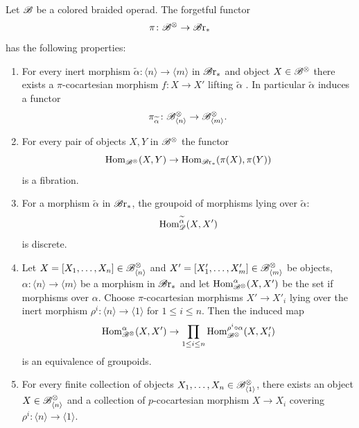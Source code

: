 \begin{prop}\label{prop:Bx-fib-properties} Let $\mathscr{B}$ be a colored braided operad.
    The forgetful functor
    \[
        \pi \colon \mathscr{B}^{\otimes} \to \mathscr{B} \text{r}_{\ast}
    \]
    has the following properties:
    \begin{enumerate}
        \item For every inert morphism $\widetilde{\alpha} \colon \langle n
        \rangle \to \langle m \rangle$  in $\mathscr{B} \text{r}_{\ast}$ and object $X \in \mathscr{B}^{\otimes}$ there
        exists a $\pi$-cocartesian morphism $f \colon X \to X'$ lifting
        $\widetilde{\alpha}$ . In particular $\widetilde{\alpha}$ induces a
        functor 
        $$\pi_{\widetilde{\alpha}} \colon \mathscr{B}^{\otimes}_{\langle n \rangle} \to
        \mathscr{B}^{\otimes}_{\langle m \rangle}.$$
        \item For every pair of objects $X,Y$ in $\mathscr{B}^{\otimes}$ the functor
        \[
                \operatorname{Hom}_{\mathscr{B}^{\otimes}}(X,Y) \to \operatorname{Hom}_{\mathscr{B} \text{r}_{\ast}}(\pi(X),\pi(Y))
        \]
        is a fibration.
        \item For a morphism $\widetilde{\alpha}$ in $\mathscr{B} \text{r}_{\ast}$, the groupoid of
        morphisms lying over $\widetilde{\alpha}$:
        $$\operatorname{Hom}_{\mathscr{D}}^{\widetilde{\alpha}}(X, X')$$ is discrete. 
        \item Let $X = [X_1, \dots, X_n] \in \mathscr{B}^{\otimes}_{\langle n \rangle}$ and $X' =
        [X_1', \dots, X_m'] \in \mathscr{B}^{\otimes}_{\langle m \rangle}$ be objects, $\alpha :
        \langle n \rangle \to \langle m \rangle$ be a morphism in $\mathscr{B} \text{r}_{\ast}$ and let
        $\operatorname{Hom}_{\mathscr{B}^{\otimes}}^{\alpha}(X, X')$ be the set if morphisms over $\alpha$. 
        Choose $\pi$-cocartesian morphisms $X' \to X'_i$ lying over the inert
        morphism $\rho^i \colon \langle n \rangle \to \langle 1 \rangle$ for $1
        \leq i \leq n$. Then the induced map
        \[
            \operatorname{Hom}_{\mathscr{B}^{\otimes}}^{\alpha}(X, X') \to \prod_{1 \leq i \leq n} \operatorname{Hom}_{\mathscr{B}^{\otimes}}^{\rho^i \circ \alpha}(X, X_i')
        \]
        is an equivalence of groupoids. 
        
        \item For every finite collection of objects $X_1, \dots, X_n \in
        \mathscr{B}^{\otimes}_{\langle 1 \rangle}$, there exists an object $X \in \mathscr{B}^{\otimes}_{\langle n
        \rangle}$ and a collection of $p$-cocartesian morphism $X \to X_i$
        covering $\rho^i \colon \langle n \rangle \to \langle 1 \rangle$.
    \end{enumerate}
\end{prop}
